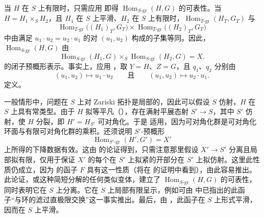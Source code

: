 当 \(H\) 在 \(S\) 上有限时，只需应用  即得 \(\operatorname{Hom}_{S\text{-}\mathrm{gr}}(H,G)\) 的可表性。当 \(H=H_1\times_SH_2\)，且 \(H_1\) 在 \(S\) 上平滑、\(H_2\) 在 \(S\) 上有限时，\(\operatorname{Hom}_{T\text{-}\mathrm{gr}}(H_T,G_T)\) 与  \[
 \operatorname{Hom}_{T\text{-}\mathrm{gr}}\bigl((H_1)_T,G_T\bigr)
 \times
 \operatorname{Hom}_{T\text{-}\mathrm{gr}}\bigl((H_2)_T,G_T\bigr)
\] 中由满足 \(u_1\mathbin{\cdot}u_2=u_2\mathbin{\cdot}u_1\) 的对 \((u_1,u_2)\) 构成的子集等同。因此，\(\operatorname{Hom}_{S\text{-}\mathrm{gr}}(H,G)\) 由  \[
 \operatorname{Hom}_{S\text{-}\mathrm{gr}}(H_1,G)
 \times_S
 \operatorname{Hom}_{S\text{-}\mathrm{gr}}(H_2,G)=X.
\] 的闭子预概形表示。事实上，应用 ，取 \(Y=H\)、\(Z=G\)，且 \(q_1\)、\(q_2\) 分别由 \[
  (u_1,u_2)\longmapsto u_1\mathbin{\cdot}u_2
  \qquad\text{且}\qquad
  (u_1,u_2)\longmapsto u_2\mathbin{\cdot}u_1.
\] 定义。

一般情形中，问题在 \(S\) 上对 Zariski 拓扑是局部的，因此可以假设 \(S\) 仿射，\(H\) 在 \(S\) 上具有常类型。由于 \(H\) 拟等平凡（），存在满射平展态射 \(S'\to S\)，其中 \(S'\) 仿射，使 \(H\) 分裂，即 \(H'=H_{S'}\) 可对角化。于是  适用，因为可对角化群是可对角化环面与有限可对角化群的乘积。还须说明 \(S'\)-预概形 \[
  \operatorname{Hom}_{S'\text{-}\mathrm{gr}}(H',G')=X'
\] 上所得的下降数据有效。这由  的论证得到，只需注意那里假设 \(X'\to S'\) 分离且局部拟有限，仅用于保证 \(X'\) 的每个在 \(S'\) 上拟紧的开部分在 \(S'\) 上拟仿射。这里此性质仍成立，因为  的函子 \(F\) 具有这一性质（将在  的证明中看到），由此容易推出。此论证，或这种简短分解的任何类似变体，建立了 \(\operatorname{Hom}_{S\text{-}\mathrm{gr}}(H,G)\) 的可表性，同时表明它在 \(S\) 上分离。它在 \(S\) 上局部有限呈示，例如可由  中已指出的此函子“与环的滤过直极限交换”这一事实推出。最后，由 ，此函子在 \(S\) 上形式平滑，因而在 \(S\) 上平滑。


